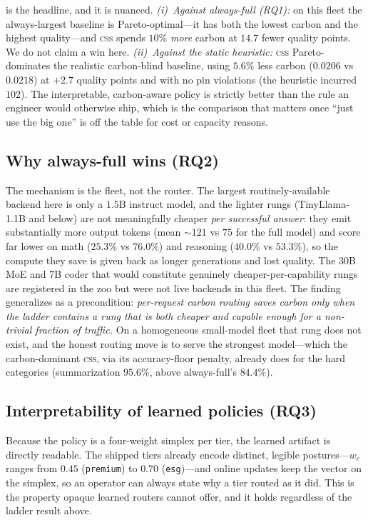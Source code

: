 \documentclass[10pt,twocolumn]{article}
\newcommand{\css}{\textsc{css}}
\begin{document}
 is the headline, and it is nuanced.
\emph{(i)~Against always-full (RQ1):} on this fleet the always-largest baseline
is Pareto-optimal---it has both the lowest carbon and the highest quality---and
\css{} spends $10\%$ \emph{more} carbon at $14.7$ fewer quality points. We do
not claim a win here.
\emph{(ii)~Against the static heuristic:} \css{} Pareto-dominates the realistic
carbon-blind baseline, using $5.6\%$ less carbon ($0.0206$ vs $0.0218$) at
$+2.7$ quality points and with no pin violations (the heuristic incurred $102$).
The interpretable, carbon-aware policy is strictly better than the rule an
engineer would otherwise ship, which is the comparison that matters once
``just use the big one'' is off the table for cost or capacity reasons.

\subsection{Why always-full wins (RQ2)}
The mechanism is the fleet, not the router. The largest routinely-available
backend here is only a $1.5$B instruct model, and the lighter rungs
(TinyLlama-1.1B and below) are not meaningfully cheaper \emph{per successful
answer}: they emit substantially more output tokens (mean $\sim$$121$ vs $75$
for the full model) and score far lower on math ($25.3\%$ vs $76.0\%$) and
reasoning ($40.0\%$ vs $53.3\%$), so the compute they save is given back as
longer generations and lost quality. The $30$B MoE and $7$B coder that would
constitute genuinely cheaper-per-capability rungs are registered in the zoo but
were not live backends in this fleet. The finding generalizes as a precondition:
\emph{per-request carbon routing saves carbon only when the ladder contains a
rung that is both cheaper and capable enough for a non-trivial fraction of
traffic.} On a homogeneous small-model fleet that rung does not exist, and the
honest routing move is to serve the strongest model---which the carbon-dominant
\css{}, via its accuracy-floor penalty, already does for the hard categories
(summarization $95.6\%$, above always-full's $84.4\%$).

\subsection{Interpretability of learned policies (RQ3)}
Because the policy is a four-weight simplex per tier, the learned artifact is
directly readable. The shipped tiers already encode distinct, legible
postures---$w_c$ ranges from $0.45$ (\texttt{premium}) to $0.70$
(\texttt{esg})---and online updates keep the vector on the simplex, so an
operator can always state why a tier routed as it did. This is the property
opaque learned routers cannot offer, and it holds regardless of the ladder
result above.
\end{document}
